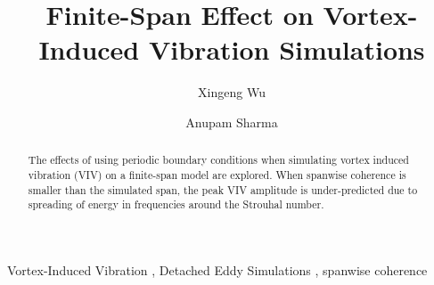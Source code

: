 \documentclass[12pt,preprint]{elsarticle}
\begin{document}
\begin{frontmatter}



\title{Finite-Span Effect on Vortex-Induced Vibration Simulations}


\author[1]{Xingeng Wu}
\author[2]{Anupam Sharma}

\address{Department of Aerospace Engineering, Iowa State University, Ames,
Iowa, 50011}


\begin{abstract}
  The effects of using periodic boundary conditions when simulating vortex
  induced vibration (VIV) on a finite-span model are explored. When spanwise
  coherence is smaller than the simulated span, the peak VIV amplitude is
  under-predicted due to spreading of energy in frequencies around the Strouhal
  number.
\end{abstract}

\begin{keyword}
  Vortex-Induced Vibration \sep 
  Detached Eddy Simulations \sep 
  spanwise coherence
\end{keyword}

\end{frontmatter}


\end{document}
